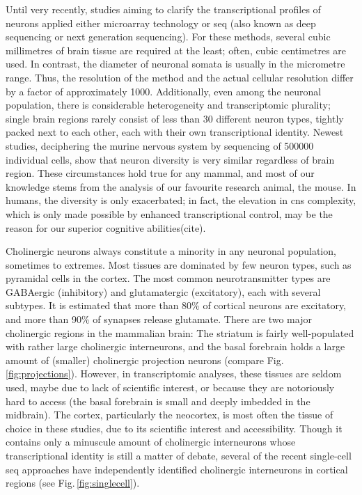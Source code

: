Until very recently, studies aiming to clarify the transcriptional profiles of neurons applied either microarray technology or \ac{seq} (also known as deep sequencing or next generation sequencing). For these methods, several cubic millimetres of brain tissue are required at the least; often, cubic centimetres are used. In contrast, the diameter of neuronal somata is usually in the micrometre range. Thus, the resolution of the method and the actual cellular resolution differ by a factor of approximately \num{1000}. Additionally, even among the neuronal population, there is considerable heterogeneity and transcriptomic plurality; single brain regions rarely consist of less than 30 different neuron types, tightly packed next to each other, each with their own transcriptional identity\cite{Darmanis2015, Zeisel2015, Tasic2016, Habib2016}. Newest studies, deciphering the murine nervous system by sequencing of \num{500000} individual cells, show that neuron diversity is very similar regardless of brain region\cite{Zeisel2018}. These circumstances hold true for any mammal, and most of our knowledge stems from the analysis of our favourite research animal, the mouse. In humans, the diversity is only exacerbated; in fact, the elevation in \ac{cns} complexity, which is only made possible by enhanced transcriptional control, may be the reason for our superior cognitive abilities(cite).

Cholinergic neurons always constitute a minority in any neuronal population, sometimes to extremes. Most tissues are dominated by few neuron types, such as pyramidal cells in the cortex. The most common neurotransmitter types are GABAergic (inhibitory) and glutamatergic (excitatory), each with several subtypes. It is estimated that more than 80\% of cortical neurons are excitatory, and more than 90\% of synapses release glutamate\cite{Raichle2002}. There are two major cholinergic regions in the mammalian brain: The striatum is fairly well-populated with rather large cholinergic interneurons, and the basal forebrain holds a large amount of (smaller) cholinergic projection neurons (compare Fig.\,\ref{fig:projections}). However, in transcriptomic analyses, these tissues are seldom used, maybe due to lack of scientific interest, or because they are notoriously hard to access (the basal forebrain is small and deeply imbedded in the midbrain). The cortex, particularly the neocortex, is most often the tissue of choice in these studies, due to its scientific interest and accessibility. Though it contains only a minuscule amount of cholinergic interneurons whose transcriptional identity is still a matter of debate, several of the recent single-cell \ac{seq} approaches have independently identified cholinergic interneurons in cortical regions (see Fig.\,\ref{fig:singlecell}).

